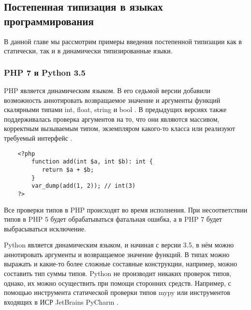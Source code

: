 \subsection{Постепенная типизация в языках программирования}

В данной главе мы рассмотрим примеры введения постепенной типизации как в статически, так и в динамически типизированные языки.
\subsubsection{PHP 7 и Python 3.5}

PHP является динамическим языком. В его седьмой версии добавили возможность аннотировать возвращаемое значение и аргументы функций скалярными типами int, float, string и bool \cite{wiki:phpScalarTypeHints}. В предыдущих версиях также поддерживалась проверка аргументов на то, что они являются массивом, корректным вызываемым типом, экземпляром какого-то класса или реализуют требуемый интерфейс \cite{wiki:phpTypeHints}.

\begin{verbatim}
    <?php        
        function add(int $a, int $b): int {
           return $a + $b;
        }
        var_dump(add(1, 2)); // int(3)
    ?>
\end{verbatim}
 

Все проверки типов в PHP происходят во время исполнения. При несоответствии типов в PHP 5 будет обрабатываться фатальная ошибка, а в PHP 7 будет выбрасываться исключение.%

Python является динамическим языком, и начиная с версии 3.5, в нём можно аннотировать аргументы и возвращаемое значение функций\cite{wiki:pythonPep484TypeHints}. В типах можно выражать и какие-то более сложные составные конструкции, например, можно составить тип суммы типов. %
%    
Python не производит никаких проверок типов, однако, их можно осуществить при помощи сторонних средств. Например, с помощью инструмента статической проверки типов mypy \cite{python:mypyHomepage} или инструментов входящих в ИСР JetBrains PyCharm \cite{python:PyCharmHomepage}.

